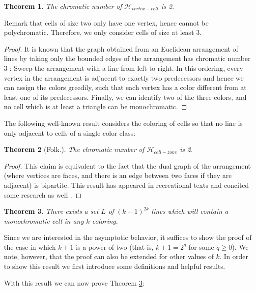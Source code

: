 \documentclass[11pt,a4paper]{article}
\newtheorem{theorem}{Theorem}
\newcommand{\Hvertexcell}{{\mathcal H}_{vertex-cell}}
\newcommand{\Hcellzone}{{\mathcal H}_{cell-zone}}
\begin{document}
\begin{theorem}\label{tight:chromvertex}
The chromatic number of $\Hvertexcell$ is 2.
\end{theorem}
\noindent Remark that cells of size two only have one vertex, hence cannot be polychromatic. Therefore,  we only consider cells of size at least 3.
\begin{proof}
It is known that the graph obtained from an Euclidean arrangement of lines by taking only the
bounded edges of the arrangement has chromatic number 3 \cite{FHNS}: Sweep the arrangement with a line from left to right. In this ordering, every vertex in the arrangement is adjacent to exactly two predecessors and hence we can assign the colors greedily, such that each vertex has a color different from at least one of its predecessors.
Finally, we can identify two of the three colors, and no cell which is at least a triangle can be monochromatic.
\end{proof}

The following well-known result considers the coloring of cells so that no line is only adjacent to cells of a single color class:

\begin{theorem}[Folk.]\label{tight:chromcells}
The chromatic number of $\Hcellzone$ is 2.
\end{theorem}
\begin{proof}
This claim is equivalent to the fact that the dual graph of the arrangement (where vertices are 
faces, and there is an edge between two faces if they are adjacent) is bipartite. This result
has appeared in recreational texts and concited some research as well \cite{L1894,Gru5}.
\end{proof}



\iffalse
\begin{theorem}\label{LB:chrom}
There exists a set $L$ of $(k+1)^{2k}$ lines which will contain a monochromatic cell in any $k$-coloring.
\end{theorem}
Since we are interested in the asymptotic behavior, it suffices to show the proof of the case in which $k+1$ is a power of two (that is, $k+1=2^q$ for some $q\geq 0$). We note, however, that the proof can also be extended for other values of $k$. In order to show this result we first introduce some definitions and helpful results.

With this result we can now prove Theorem \ref{LB:chrom}:
\end{document}
